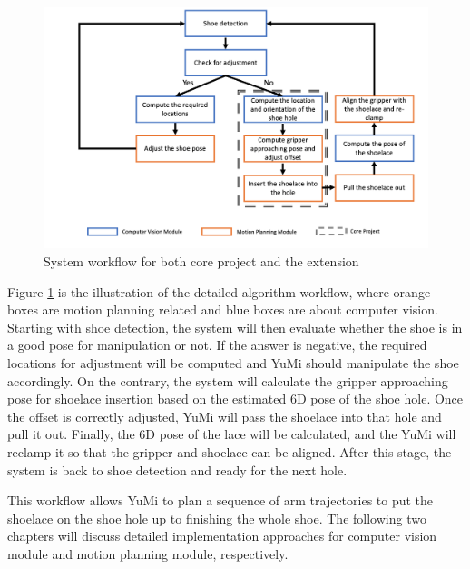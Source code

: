 \begin{figure}[H]
\centering
\includegraphics[width = \columnwidth]{AnalysisDesign/workflow.png}
\caption{System workflow for both core project and the extension}
\label{workflow}
\end{figure}

Figure \ref{workflow} is the illustration of the detailed algorithm workflow, where orange boxes are motion planning related and blue boxes are about computer vision. Starting with shoe detection, the system will then evaluate whether the shoe is in a good pose for manipulation or not. If the answer is negative, the required locations for adjustment will be computed and YuMi should manipulate the shoe accordingly. On the contrary, the system will calculate the gripper approaching pose for shoelace insertion based on the estimated 6D pose of the shoe hole. Once the offset is correctly adjusted, YuMi will pass the shoelace into that hole and pull it out. Finally, the 6D pose of the lace will be calculated, and the YuMi will reclamp it so that the gripper and shoelace can be aligned. After this stage, the system is back to shoe detection and ready for the next hole.

This workflow allows YuMi to plan a sequence of arm trajectories to put the shoelace on the shoe hole up to finishing the whole shoe. The following two chapters will discuss detailed implementation approaches for computer vision module and motion planning module, respectively.